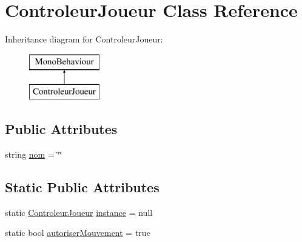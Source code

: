 \hypertarget{class_controleur_joueur}{}\section{Controleur\+Joueur Class Reference}
\label{class_controleur_joueur}
Inheritance diagram for Controleur\+Joueur\+:\begin{figure}[H]
\begin{center}
\leavevmode
\includegraphics[height=2.000000cm]{class_controleur_joueur}
\end{center}
\end{figure}
\subsection*{Public Attributes}
\begin{DoxyCompactItemize}
\item 
string \mbox{\hyperlink{class_controleur_joueur_ae3daabb127508467427792e952123acf}{nom}} = \char`\"{}\char`\"{}
\end{DoxyCompactItemize}
\subsection*{Static Public Attributes}
\begin{DoxyCompactItemize}
\item 
static \mbox{\hyperlink{class_controleur_joueur}{Controleur\+Joueur}} \mbox{\hyperlink{class_controleur_joueur_ac7deae3a66b01bb158a1920e47969925}{instance}} = null
\item 
static bool \mbox{\hyperlink{class_controleur_joueur_a590a9556e120874ec56fcea1b69601b0}{autoriser\+Mouvement}} = true
\end{DoxyCompactItemize}
